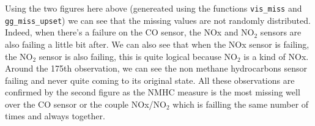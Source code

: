 Using the two figures here above (genereated using the functions \verb|vis_miss| and \verb|gg_miss_upset|) we can see that the missing values are not randomly distributed.
Indeed, when there's a failure on the CO sensor, the NOx and NO$_2$ sensors are also failing a little bit after.
We can also see that when the NOx sensor is failing, the NO$_2$ sensor is also failing, this is quite logical because NO$_2$ is a kind of NOx.
Around the 175th observation, we can see the non methane hydrocarbons sensor failing and never quite coming to its original state. 
All these observations are confirmed by the second figure as the NMHC measure is the most missing well over the CO sensor or the couple NOx/NO$_2$ which is failling the same number of times and always together.


